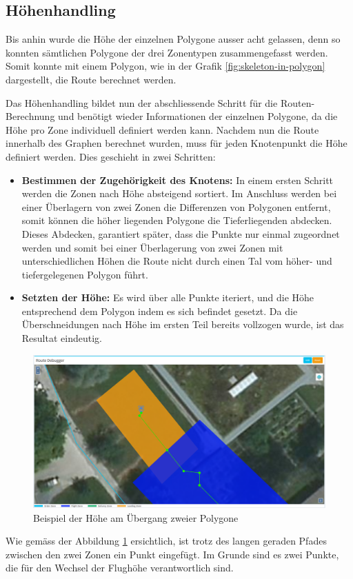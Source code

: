 \subsection{Höhenhandling}
Bis anhin wurde die Höhe der einzelnen Polygone ausser acht gelassen, denn so konnten sämtlichen Polygone der drei Zonentypen zusammengefasst werden. Somit konnte mit einem Polygon, wie in der Grafik \ref{fig:skeleton-in-polygon} dargestellt, die Route berechnet werden.

Das Höhenhandling bildet nun der abschliessende Schritt für die Routen-Berechnung und benötigt wieder Informationen der einzelnen Polygone, da die Höhe pro Zone individuell definiert werden kann.
Nachdem nun die Route innerhalb des Graphen berechnet wurden, muss für jeden Knotenpunkt die Höhe definiert werden. Dies geschieht in zwei Schritten:
\begin{itemize}
	\item{\textbf{Bestimmen der Zugehörigkeit des Knotens:} In einem ersten Schritt werden die Zonen nach Höhe absteigend sortiert. Im Anschluss werden bei einer Überlagern von zwei Zonen die Differenzen von Polygonen entfernt, somit können die höher liegenden Polygone die Tieferliegenden abdecken. Dieses Abdecken, garantiert später, dass die Punkte nur einmal zugeordnet werden und somit bei einer Überlagerung von zwei Zonen mit unterschiedlichen Höhen die Route nicht durch einen Tal vom höher- und tiefergelegenen Polygon führt.}
	\item{\textbf{Setzten der Höhe:} Es wird über alle Punkte iteriert, und die Höhe entsprechend dem Polygon indem es sich befindet gesetzt. Da die Überschneidungen nach Höhe im ersten Teil bereits vollzogen wurde, ist das Resultat eindeutig.}
\end{itemize}
\begin{figure}[h]
	\centering
	\includegraphics[width=1.0\textwidth]{images/routing/height_example.png}
	\caption{Beispiel der Höhe am Übergang zweier Polygone}
	\label{fig:polygon-border-example}
\end{figure}
Wie gemäss der Abbildung \ref{fig:polygon-border-example} ersichtlich, ist trotz des langen geraden Pfades zwischen den zwei Zonen ein Punkt eingefügt. Im Grunde sind es zwei Punkte, die für den Wechsel der Flughöhe verantwortlich sind.
\newpage
